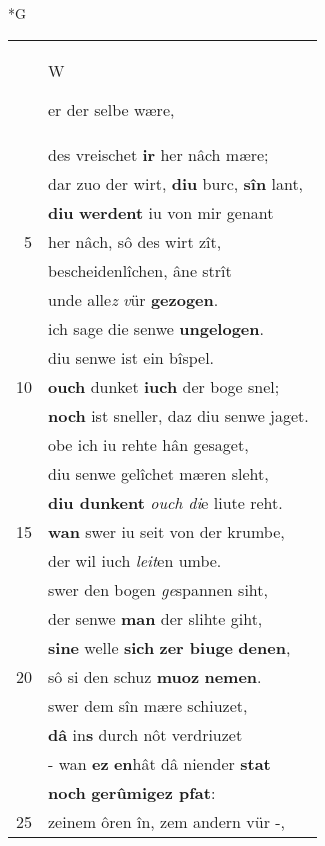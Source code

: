 \documentclass[8pt,a4paper,notitlepage]{article}
\begin{document}
\newpage
\begin{table}[ht]
\begin{minipage}[t]{0.5\linewidth}
\small
\begin{center}*G
\end{center}
\begin{tabular}{rl}
 & \begin{large}W\end{large}er der selbe wære,\\ 
 & des vreischet \textbf{ir} her nâch mære;\\ 
 & dar zuo der wirt, \textbf{diu} burc, \textbf{sîn} lant,\\ 
 & \textbf{diu} \textbf{werdent} iu von mir genant\\ 
5 & her nâch, sô des wirt zît,\\ 
 & bescheidenlîchen, âne strît\\ 
 & unde alle\textit{z} \textit{v}ür \textbf{gezogen}.\\ 
 & ich sage die senwe \textbf{ungelogen}.\\ 
 & diu senwe ist ein bîspel.\\ 
10 & \textbf{ouch} dunket \textbf{iuch} der boge snel;\\ 
 & \textbf{noch} ist sneller, daz diu senwe jaget.\\ 
 & obe ich iu rehte hân gesaget,\\ 
 & diu senwe gelîchet mæren sleht,\\ 
 & \textbf{diu dunkent} \textit{ouch di}e liute reht.\\ 
15 & \textbf{wan} swer iu seit von der krumbe,\\ 
 & der wil iuch \textit{leit}en umbe.\\ 
 & swer den bogen \textit{ge}spannen siht,\\ 
 & der senwe \textbf{man} der slihte giht,\\ 
 & \textbf{si}\textbf{ne} welle \textbf{sich} \textbf{zer biuge} \textbf{denen},\\ 
20 & sô si den schuz \textbf{muoz} \textbf{nemen}.\\ 
 & swer dem sîn mære schiuzet,\\ 
 & \textbf{dâ} in\textbf{s} durch nôt verdriuzet\\ 
 & - wan \textbf{ez} \textbf{en}hât dâ niender \textbf{stat}\\ 
 & \textbf{noch} \textbf{gerûmigez pfat}:\\ 
25 & zeinem ôren în, zem andern vür -,\\ 

\end{tabular}
\end{minipage}
\end{table}
\end{document}
